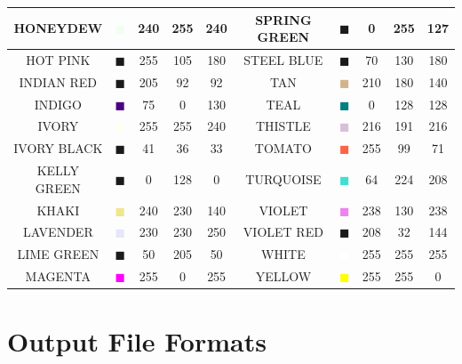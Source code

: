 \documentclass[11pt]{book}
\begin{document}
\begin{table}[H]
\begin{center}
\begin{tabular}{|c|c|c|c|c|c||c|c|c|c|}
{\ct HONEYDEW} & \textcolor{HONEYDEW} {$\blacksquare$} & 240& 255& 240& {\ct SPRING GREEN} &  \textcolor{SPRING GREEN} {$\blacksquare$} & 0& 255& 127  \\ \hline
{\ct HOT PINK} & \textcolor{HOT PINK} {$\blacksquare$} & 255& 105& 180& {\ct STEEL BLUE} &  \textcolor{STEEL BLUE} {$\blacksquare$} & 70& 130& 180  \\ \hline
{\ct INDIAN RED} & \textcolor{INDIAN RED} {$\blacksquare$} & 205& 92& 92& {\ct TAN} &  \textcolor{TAN} {$\blacksquare$} & 210& 180& 140  \\ \hline
{\ct INDIGO} & \textcolor{INDIGO} {$\blacksquare$} & 75& 0& 130& {\ct TEAL} &  \textcolor{TEAL} {$\blacksquare$} & 0& 128& 128  \\ \hline
{\ct IVORY} & \textcolor{IVORY} {$\blacksquare$} & 255& 255& 240& {\ct THISTLE} &  \textcolor{THISTLE} {$\blacksquare$} & 216& 191& 216  \\ \hline
{\ct IVORY BLACK} & \textcolor{IVORY BLACK} {$\blacksquare$} & 41& 36& 33& {\ct TOMATO } &  \textcolor{TOMATO } {$\blacksquare$} & 255& 99& 71  \\ \hline
{\ct KELLY GREEN} & \textcolor{KELLY GREEN} {$\blacksquare$} & 0& 128& 0& {\ct TURQUOISE} &  \textcolor{TURQUOISE} {$\blacksquare$} & 64& 224& 208  \\ \hline
{\ct KHAKI} & \textcolor{KHAKI} {$\blacksquare$} & 240& 230& 140& {\ct VIOLET} &  \textcolor{VIOLET} {$\blacksquare$} & 238& 130& 238  \\ \hline
{\ct LAVENDER} & \textcolor{LAVENDER} {$\blacksquare$} & 230& 230& 250& {\ct VIOLET RED} &  \textcolor{VIOLET RED} {$\blacksquare$} & 208& 32& 144  \\ \hline
{\ct LIME GREEN} & \textcolor{LIME GREEN} {$\blacksquare$} & 50& 205& 50& {\ct WHITE} &  \textcolor{WHITE} {$\blacksquare$} & 255& 255& 255  \\ \hline
{\ct MAGENTA} & \textcolor{MAGENTA} {$\blacksquare$} & 255& 0& 255& {\ct YELLOW} &  \textcolor{YELLOW} {$\blacksquare$} & 255& 255& 0  \\ \hline

\hline
\end{tabular}
\end{center}
\end{table}




\chapter{Output File Formats}
\end{document}
